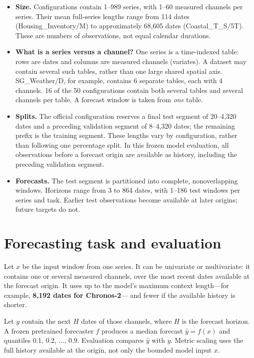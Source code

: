 \documentclass[11pt,a4paper]{article}
\begin{document}
\begin{itemize}
\item \textbf{Size.} Configurations contain 1--989 series, with 1--60 measured
channels per series. Their mean full-series lengths range from 114 dates
(Housing\_Inventory/M) to approximately 68,605 dates (Coastal\_T\_S/5T).
These are numbers of observations, not equal calendar durations.
\item \textbf{What is a series versus a channel?} One series is a time-indexed
table: rows are dates and columns are measured channels (variates). A dataset
may contain several such tables, rather than one large shared spatial axis.
SG\_Weather/D, for example, contains 6 separate tables, each with 4 channels.
16 of the 50 configurations contain both several tables and several channels
per table. A forecast window is taken from \emph{one} table.
\item \textbf{Splits.} The official configuration reserves a final test
segment of 20--4,320 dates and a preceding validation segment of 8--4,320
dates; the remaining prefix is the training segment. These lengths vary
by configuration, rather than following one percentage split. In this frozen
model evaluation, all observations before a forecast origin are available
as history, including the preceding validation segment.
\item \textbf{Forecasts.} The test segment is partitioned into complete,
nonoverlapping windows. Horizons range from 3 to 864 dates, with 1--186
test windows per series and task. Earlier test observations become available
at later origins; future targets do not.
\end{itemize}

\newpage
\section{Forecasting task and evaluation}
Let $x$ be the input window from one series. It can be univariate or
multivariate: it contains one or several measured channels, over the most
recent dates available at the forecast origin. It uses up to the model's
maximum context length---for example, \textbf{8,192 dates for Chronos-2}---
and fewer if the available history is shorter.

Let $y$ contain the next $H$ dates of those channels, where $H$ is the
forecast horizon. A frozen pretrained forecaster $f$ produces a median
forecast $\hat y=f(x)$ and quantiles 0.1, 0.2, $\ldots$, 0.9.
Evaluation compares $\hat y$ with $y$. Metric scaling uses the full
history available at the origin, not only the bounded model input $x$.
\end{document}
